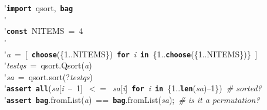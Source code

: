 \'\>\texttt{\textbf{import}}~qsort,~\texttt{\textbf{bag}}\\

\'\>\\

\'\>\texttt{\textbf{const}}~NITEMS~=~4\\

\'\>\\

\'\>\textit{a}~=~[~\texttt{\textbf{choose}}(\{1..NITEMS\})~\texttt{\textbf{for}}~\textit{i}~\texttt{\textbf{in}}~\{1..\texttt{\textbf{choose}}(\{1..NITEMS\})\}~]\\

\'\>\textit{testqs}~=~qsort.Qsort(\textit{a})\\

\'\>\textit{sa}~=~qsort.sort(?\textit{testqs})\\

\'\>\texttt{\textbf{assert}}~\texttt{\textbf{all}}(\textit{sa}[\textit{i}~--~1]~$<=$~\textit{sa}[\textit{i}]~\texttt{\textbf{for}}~\textit{i}~\texttt{\textbf{in}}~\{1..\texttt{\textbf{len}}(\textit{sa})--1\})~\emph{\# sorted?}\\

\'\>\texttt{\textbf{assert}}~\texttt{\textbf{bag}}.fromList(\textit{a})~==~\texttt{\textbf{bag}}.fromList(\textit{sa});~\emph{\# is it a permutation?}